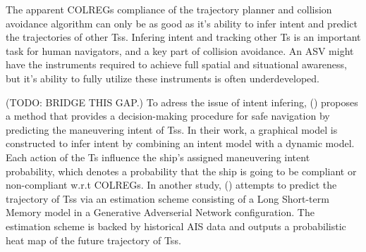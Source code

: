 The apparent \gls{COLREGs} compliance of the trajectory planner and collision avoidance algorithm can only be as 
good as it's ability to infer intent and predict the trajectories of other \gls{Ts}s. 
Infering intent and tracking other \gls{Ts} is an important task for human navigators, and a key part of collision avoidance.
An \gls{ASV} might have the instruments required to achieve full spatial and situational awareness, but it's ability to
fully utilize these instruments is often underdeveloped.

(TODO: BRIDGE THIS GAP.)\newline
To adress the issue of intent infering, (\cite{cho2018intent}) proposes a method that provides a decision-making procedure
for safe navigation by predicting the maneuvering intent of \gls{Ts}s. In their work, a graphical model is constructed to infer intent by
combining an intent model with a dynamic model. Each action of the \gls{Ts} influence the ship's assigned maneuvering intent probability,
which denotes a probability that the ship is going to be compliant or non-compliant w.r.t \gls{COLREGs}.
In another study, (\cite{scholler2021trajectory}) attempts to predict the trajectory of \gls{Ts}s via an estimation scheme consisting
of a Long Short-term Memory model in a Generative Adverserial Network configuration. The estimation scheme is backed by historical \gls{AIS} data
and outputs a probabilistic heat map of the future trajectory of \gls{Ts}s.

